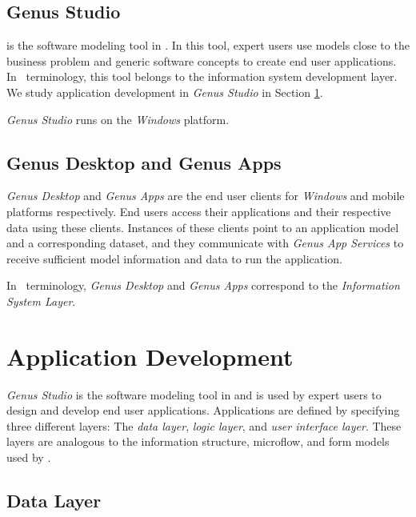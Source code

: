 \subsection{Genus Studio}
\label{sub:Genus Studio}
 is the software modeling tool in \gap. In this tool, expert users use models close to the business problem and generic software concepts to create end user applications. In \mde~terminology, this tool belongs to the information system development layer. We study application development in \textit{Genus Studio} in Section \ref{sec:Application Development}.

\textit{Genus Studio} runs on the \textit{Windows} platform.

\subsection{Genus Desktop and Genus Apps}
\label{sub:Genus Desktop and Genus Apps}
\textit{Genus Desktop} and \textit{Genus Apps} are the end user clients for \textit{Windows} and mobile platforms respectively. End users access their applications and their respective data using these clients. Instances of these clients point to an application model and a corresponding dataset, and they communicate with \textit{Genus App Services} to receive sufficient model information and data to run the application. 

In \mdd~terminology, \textit{Genus Desktop} and \textit{Genus Apps} correspond to the \textit{Information System Layer}.

\section{Application Development}
\label{sec:Application Development}
\textit{Genus Studio} is the software modeling tool in \gap and is used by expert users to design and develop end user applications. Applications are defined by specifying three different layers: The \textit{data layer}, \textit{logic layer}, and \textit{user interface layer}. These layers are analogous to the information structure, microflow, and form models used by \mendix.

\subsection{Data Layer}
\label{sub:Data Layer}


